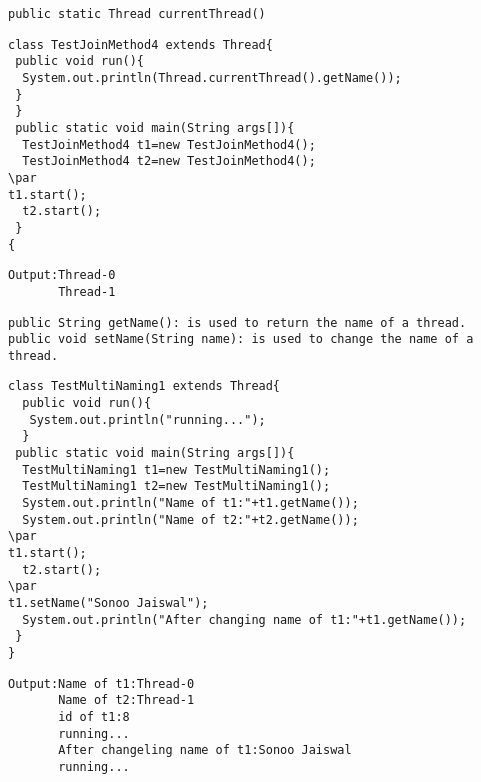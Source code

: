 \documentclass{book}
\def\lthtmlcheckvsize{\ifdim\ht\sizebox<\vsize 
  \ifdim\wd\sizebox<\hsize\expandafter\hfill\fi \expandafter\vfill
  \else\expandafter\vss\fi}%
\begin{document}
{\newpage\clearpage
{}%
\begin{lstlisting}
public static Thread currentThread()
\end{lstlisting}%
\lthtmlfigureZ
\lthtmlcheckvsize\clearpage}

{\newpage\clearpage
{}%
\begin{lstlisting} 
class TestJoinMethod4 extends Thread{  
 public void run(){  
  System.out.println(Thread.currentThread().getName());  
 }  
 }  
 public static void main(String args[]){  
  TestJoinMethod4 t1=new TestJoinMethod4();  
  TestJoinMethod4 t2=new TestJoinMethod4();  
\par
t1.start();  
  t2.start();  
 }  
{  
\end{lstlisting}%
\lthtmlfigureZ
\lthtmlcheckvsize\clearpage}

{\newpage\clearpage
{}%
\begin{lstlisting}
Output:Thread-0
       Thread-1
\end{lstlisting}%
\lthtmlfigureZ
\lthtmlcheckvsize\clearpage}

{\newpage\clearpage
{}%
\begin{lstlisting} 
public String getName(): is used to return the name of a thread.
public void setName(String name): is used to change the name of a thread.
\end{lstlisting}%
\lthtmlfigureZ
\lthtmlcheckvsize\clearpage}

{\newpage\clearpage
{}%
\begin{lstlisting}
class TestMultiNaming1 extends Thread{  
  public void run(){  
   System.out.println("running...");  
  }  
 public static void main(String args[]){  
  TestMultiNaming1 t1=new TestMultiNaming1();  
  TestMultiNaming1 t2=new TestMultiNaming1();  
  System.out.println("Name of t1:"+t1.getName());  
  System.out.println("Name of t2:"+t2.getName());  
\par
t1.start();  
  t2.start();  
\par
t1.setName("Sonoo Jaiswal");  
  System.out.println("After changing name of t1:"+t1.getName());  
 }  
}  
\end{lstlisting}%
\lthtmlfigureZ
\lthtmlcheckvsize\clearpage}

{\newpage\clearpage
{}%
\begin{lstlisting}
Output:Name of t1:Thread-0
       Name of t2:Thread-1
       id of t1:8
       running...
       After changeling name of t1:Sonoo Jaiswal
       running...
\end{lstlisting}%
\lthtmlfigureZ
\lthtmlcheckvsize\clearpage}
\end{document}
